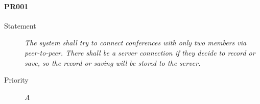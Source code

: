 \paragraph{PR001}
  \begin{description}
  \item [Statement] 
    \textit{ The system shall try to connect conferences with only two members via peer-to-peer.
			There shall be a server connection if they decide to record or save, so the record or saving will be stored to the server.}
  \item [Priority] \textit{A}
\end{description}
